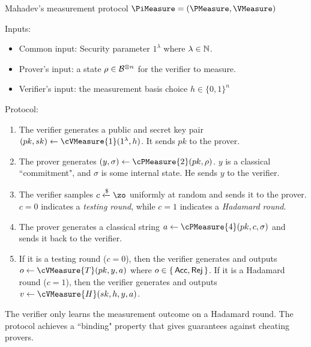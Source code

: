 
\begin{protocol}{Mahadev's measurement protocol $\PiMeasure=(\PMeasure, \VMeasure)$}
\label{proto:urmila4}

Inputs:
\begin{itemize}
    \item Common input: Security parameter $1^\lambda$ where $\lambda\in\mathbb{N}$.
    \item Prover's input: a state $\rho\in\mathcal{B}^{\otimes n}$ for the verifier to measure.
    \item Verifier's input:
        the measurement basis choice $h \in \{0,1\}^n$
\end{itemize}

Protocol:
\begin{enumerate}
    \item \label{step:measure1} The verifier generates a public and secret key pair $(pk, sk)\leftarrow\cVMeasure{1}(1^\lambda, h)$. It sends $pk$ to the prover.
    \item \label{step:measure2} The prover generates $(y, \sigma)\leftarrow\cPMeasure{2}(pk, \rho)$.
        $y$ is a classical ``commitment", and $\sigma$ is some internal state.
        He sends $y$ to the verifier.
    \item \label{step:measure3} The verifier samples $c\xleftarrow{\$}\zo$ uniformly at random and sends it to the prover. $c=0$ indicates a \emph{testing round}, while $c=1$ indicates a \emph{Hadamard round}.
    \item \label{step:measure4} The prover generates a classical string $a\leftarrow\cPMeasure{4}(pk, c, \sigma)$ and sends it back to the verifier.
    \item \label{step:output} If it is a testing round ($c=0$), then the verifier generates and outputs $o\leftarrow\cVMeasure{T}(pk, y, a)$ where $o\in\set{\mathsf{Acc}, \mathsf{Rej}}$.
        If it is a Hadamard round ($c=1$), then the verifier generates and outputs $v\leftarrow\cVMeasure{H}(sk, h, y, a)$.
\end{enumerate}
\end{protocol}

The verifier only learns the measurement outcome on a Hadamard round.
The protocol achieves a ``binding" property that gives guarantees against cheating provers.

